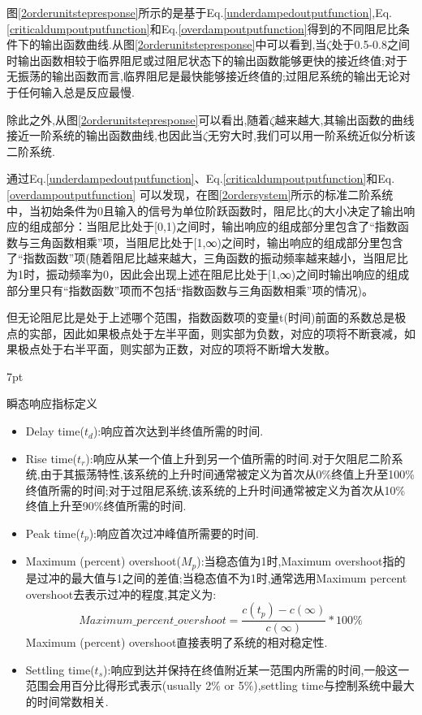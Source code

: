 \documentclass{article}
\numberwithin{equation}{section}
\numberwithin{figure}{section}
\newenvironment{formal}{%
\def\FrameCommand{%
\hspace{1pt}%
{\color{DarkBlue}\vrule width 2pt}%
{\color{formalshade}\vrule width 4pt}%
\colorbox{formalshade}%
}%
\MakeFramed{\advance\hsize-\width\FrameRestore}%
\noindent\hspace{-4.55pt}%
\begin{adjustwidth}{}{7pt}%
\vspace{2pt}\vspace{2pt}%
}
{%
\vspace{2pt}\end{adjustwidth}\endMakeFramed%
}
\begin{document}
图\ref{2orderunitstepresponse}所示的是基于Eq.\ref{underdampedoutputfunction},Eq.\ref{criticaldumpoutputfunction}和Eq.\ref{overdampoutputfunction}得到的不同阻尼比条件下的输出函数曲线.从图\ref{2orderunitstepresponse}中可以看到,当$\zeta$处于0.5-0.8之间时输出函数相较于临界阻尼或过阻尼状态下的输出函数能够更快的接近终值;对于无振荡的输出函数而言,临界阻尼是最快能够接近终值的;过阻尼系统的输出无论对于任何输入总是反应最慢.

除此之外,从图\ref{2orderunitstepresponse}可以看出,随着$\zeta$越来越大,其输出函数的曲线接近一阶系统的输出函数曲线,也因此当$\zeta$无穷大时,我们可以用一阶系统近似分析该二阶系统.

通过Eq.\ref{underdampedoutputfunction}、Eq.\ref{criticaldumpoutputfunction}和Eq.\ref{overdampoutputfunction} 可以发现，在图\ref{2ordersystem}所示的标准二阶系统中，当初始条件为0且输入的信号为单位阶跃函数时，阻尼比$\zeta$的大小决定了输出响应的组成部分：当阻尼比处于[0,1)之间时，输出响应的组成部分里包含了“指数函数与三角函数相乘”项，当阻尼比处于[1,∞)之间时，输出响应的组成部分里包含了“指数函数”项(随着阻尼比越来越大，三角函数的振动频率越来越小，当阻尼比为1时，振动频率为0，因此会出现上述在阻尼比处于[1,∞)之间时输出响应的组成部分里只有“指数函数”项而不包括“指数函数与三角函数相乘”项的情况)。

但无论阻尼比是处于上述哪个范围，指数函数项的变量t(时间)前面的系数总是极点的实部，因此如果极点处于左半平面，则实部为负数，对应的项将不断衰减，如果极点处于右半平面，则实部为正数，对应的项将不断增大发散。

\begin{formal}
    瞬态响应指标定义
    \begin{itemize}
        \item Delay time($t_d$):响应首次达到半终值所需的时间.
        \item Rise time($t_r$):响应从某一个值上升到另一个值所需的时间.对于欠阻尼二阶系统,由于其振荡特性,该系统的上升时间通常被定义为首次从0\%终值上升至100\%终值所需的时间;对于过阻尼系统,该系统的上升时间通常被定义为首次从10\%终值上升至90\%终值所需的时间.
        \item Peak time($t_p$):响应首次过冲峰值所需要的时间.
        \item Maximum (percent) overshoot($M_p$):当稳态值为1时,Maximum overshoot指的是过冲的最大值与1之间的差值;当稳态值不为1时,通常选用Maximum percent overshoot去表示过冲的程度,其定义为:
        \begin{equation}
            Maximum\_percent\_overshoot=\frac{c(t_p)-c(∞)}{c(∞)}*100\%
        \end{equation}
        Maximum (percent) overshoot直接表明了系统的相对稳定性.
        \item Settling time($t_s$):响应到达并保持在终值附近某一范围内所需的时间,一般这一范围会用百分比得形式表示(usually 2\% or 5\%),settling time与控制系统中最大的时间常数相关.
    \end{itemize}
\end{formal}
\end{document}
